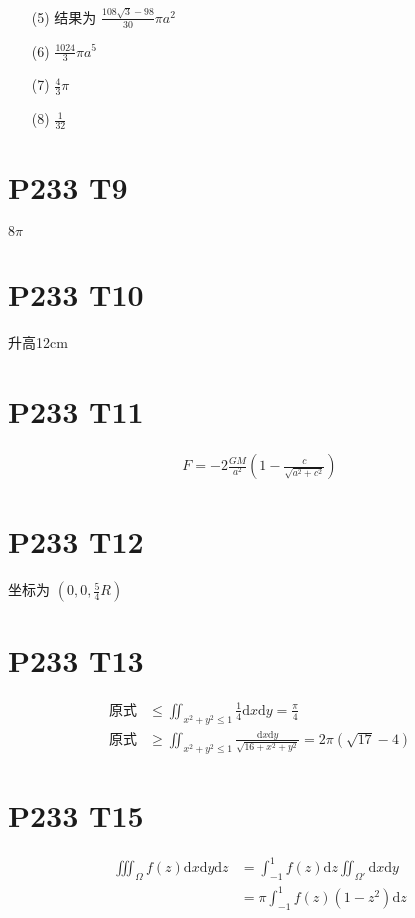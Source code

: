 \documentclass{article}
\newcommand{\dd}{\mathrm{d}}
\begin{document}
\begin{itemize}
    \item [(5)] 结果为 $\frac{108\sqrt{3} - 98}{30}\pi a^2$
    \item [(6)] $\frac{1024}{3}\pi a^5$
    \item [(7)] $\frac{4}{3}\pi$
    \item [(8)] $\frac{1}{32}$
\end{itemize}

\section*{P233 T9}

$8 \pi$

\section*{P233 T10}

升高12cm

\section*{P233 T11}

\begin{align*}
    F = -2\frac{GM}{a^2}\left(1 - \frac{c}{\sqrt{a^2 + c^2}}\right)
\end{align*}

\section*{P233 T12}

坐标为 $\left(0, 0, \frac{5}{4}R\right)$

\section*{P233 T13}

\begin{align*}
    \text{原式} &\leq \iint_{x^2 + y^2 \leq 1}\frac{1}{4}\dd x \dd y = \frac{\pi}{4} \\
    \text{原式} & \geq \iint_{x^2 + y^2 \leq 1}\frac{\dd x \dd y}{\sqrt{16 + x^2 + y^2}} = 2\pi \left(\sqrt{17} - 4\right)
\end{align*}

\section*{P233 T15}

\begin{align*}
    \iiint_{\Omega}f(z)\dd x \dd y \dd z &= \int_{-1}^{1}f(z)\dd z \iint_{\Omega'}\dd x \dd y \\
    &= \pi \int_{-1}^{1}f(z)(1 - z^2)\dd z
\end{align*}
\end{document}
